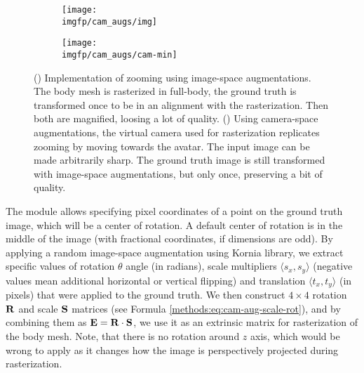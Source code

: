 \begin{figure}[ht]
	\centering
	\begin{subfigure}[b]{0.48\textwidth}
		\centering
		\texttt{[image: \\imgfp/cam\_augs/img]}%
		\caption{}
		\label{fig:cam_aug:before}
	\end{subfigure}
	\begin{subfigure}[b]{0.48\textwidth}
		\centering
		\texttt{[image: \\imgfp/cam\_augs/cam-min]}%
		\caption{}
		\label{fig:cam_aug:after}
	\end{subfigure}
	\caption{(\protect{}) Implementation of zooming using image-space augmentations. The body mesh is rasterized in full-body, the ground truth is transformed once to be in an alignment with the rasterization. Then both are magnified, loosing a lot of quality. (\protect{}) Using camera-space augmentations, the virtual camera used for rasterization replicates zooming by moving towards the avatar. The input image can be made arbitrarily sharp. The ground truth image is still transformed with image-space augmentations, but only once, preserving a bit of quality.}
	\label{fig:cam_aug}
\end{figure}

The module allows specifying pixel coordinates of a point on the ground truth image, which will be a center of rotation. A default center of rotation is in the middle of the image (with fractional coordinates, if dimensions are odd). By applying a random image-space augmentation using Kornia library, we extract specific values of rotation $\theta$ angle (in radians), scale multipliers $\langle s_x, s_y \rangle$ (negative values mean additional horizontal or vertical flipping) and translation $\langle t_x, t_y \rangle$ (in pixels) that were applied to the ground truth. We then construct $4\times4$ rotation $\bm{\mathrm{R}}$ and scale $\bm{\mathrm{S}}$ matrices (see Formula \ref{methods:eq:cam-aug-scale-rot}), and by combining them as $\bm{\mathrm{E}} = \bm{\mathrm{R}} \cdot \bm{\mathrm{S}}$, we use it as an extrinsic matrix for rasterization of the body mesh. Note, that there is no rotation around $z$ axis, which would be wrong to apply as it changes how the image is perspectively projected during rasterization.

